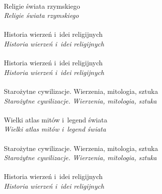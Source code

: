 \documentclass[a4paper,11pt]{article}
\begin{document}
\noindent
{} \\
\Jest  Religie świata rzymskiego \\
\Powin \emph{Religie świata rzymskiego} \\
 \\
\Jest  Historia wierzeń i~idei religijnych \\
\Powin \emph{Historia wierzeń i~idei religijnych} \\
 \\
\Jest  Historia wierzeń i~idei religijnych \\
\Powin \emph{Historia wierzeń i~idei religijnych} \\
 \\
\Jest  Starożytne cywilizacje. Wierzenia, mitologia, sztuka \\
\Powin \emph{Starożytne cywilizacje. Wierzenia, mitologia, sztuka} \\
 \\
\Jest  Wielki atlas mitów i~legend świata \\
\Powin \emph{Wielki atlas mitów i~legend świata} \\
 \\
\Jest  Starożytne cywilizacje. Wierzenia, mitologia, sztuka \\
\Powin \emph{Starożytne cywilizacje. Wierzenia, mitologia, sztuka} \\
 \\
\Jest  Historia wierzeń i~idei religijnych \\
\Powin \emph{Historia wierzeń i~idei religijnych} \\


\vspace{\spaceTwo}






 {}



\end{document}
